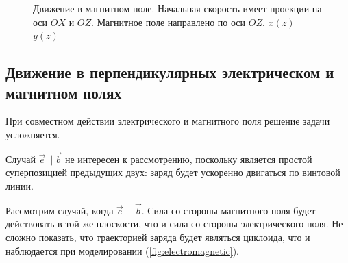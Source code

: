 \documentclass[12pt,a4paper]{article}
\begin{document}
\begin{figure}[h]%
\centering
%
%
\hspace{8pt}%
%
%
\hspace{8pt}%
%
\caption[Движение в магнитном поле]{Движение в магнитном поле. Начальная скорость имеет проекции на оси $OX$ и $OZ$. Магнитное поле направлено по оси $OZ$.
 $x(z)$ %
 $y(z)$} %
\label{fig:magnetic_vz}%
\end{figure}

\subsection{Движение в перпендикулярных электрическом и магнитном полях}

При совместном действии электрического и магнитного поля решение задачи усложняется.

Случай $\vec{e}\ ||\ \vec{b}$ не интересен к рассмотрению, поскольку является простой суперпозицией предыдущих двух: заряд будет ускоренно двигаться по винтовой линии.

Рассмотрим случай, когда $\vec{e}\ \bot\ \vec{b}$. Сила со стороны магнитного поля будет действовать в той же плоскости, что и сила со стороны электрического поля. Не сложно показать, что траекторией заряда будет являться циклоида, что и наблюдается при моделировании (\autoref{fig:electromagnetic}).
\end{document}
